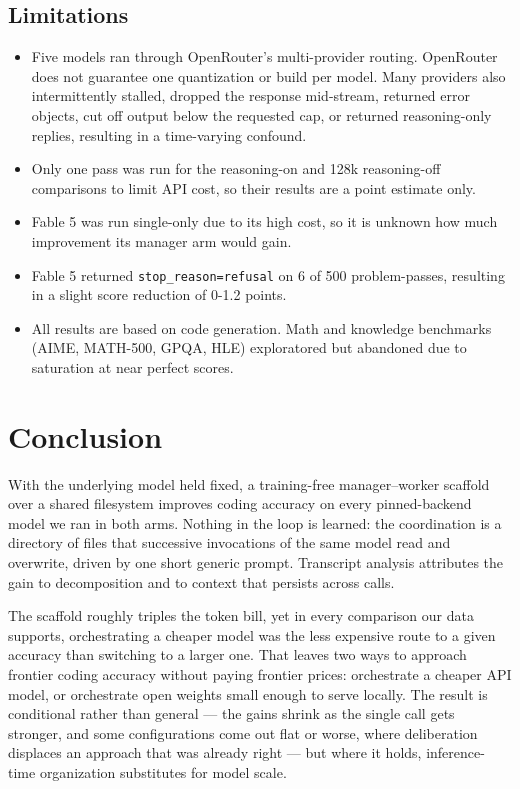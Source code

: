 \documentclass{article}
\begin{document}
\subsection{Limitations}
\label{sec:limitations}

\begin{itemize}
  \item Five models ran through OpenRouter's multi-provider routing. OpenRouter does
  not guarantee one quantization or build per model. Many providers also intermittently stalled, dropped the response
  mid-stream, returned error objects, cut off output below the requested cap, or returned
  reasoning-only replies, resulting in a time-varying confound.

  \item Only one pass was run for the reasoning-on and 128k
  reasoning-off comparisons to limit API cost, so their results are a point estimate only.

  \item Fable 5 was run single-only due to its high cost, so it is unknown how much improvement its manager arm would gain.

  \item Fable 5
  returned \texttt{stop\_reason=refusal} on 6 of 500 problem-passes, resulting in a slight score reduction of 0-1.2 points.

  \item All results are based on code
  generation. Math and knowledge benchmarks (AIME, MATH-500, GPQA, HLE) exploratored but abandoned due to saturation at near perfect scores.
\end{itemize}

\section{Conclusion}
\label{sec:conclusion}

With the underlying model held fixed, a training-free manager--worker scaffold over a shared
filesystem improves coding accuracy on every pinned-backend model we ran in both arms. Nothing
in the loop is learned: the coordination is a directory of files that successive invocations of
the same model read and overwrite, driven by one short generic prompt. Transcript analysis
attributes the gain to decomposition and to context that persists across calls.

The scaffold roughly triples the token bill, yet in every comparison our data supports,
orchestrating a cheaper model was the less expensive route to a given accuracy than switching to
a larger one. That leaves two ways to approach frontier coding accuracy without paying frontier
prices: orchestrate a cheaper API model, or orchestrate open weights small enough to serve
locally. The result is conditional rather than general --- the gains shrink as the single call
gets stronger, and some configurations come out flat or worse, where deliberation displaces an
approach that was already right --- but where it holds, inference-time organization substitutes
for model scale.
\end{document}
